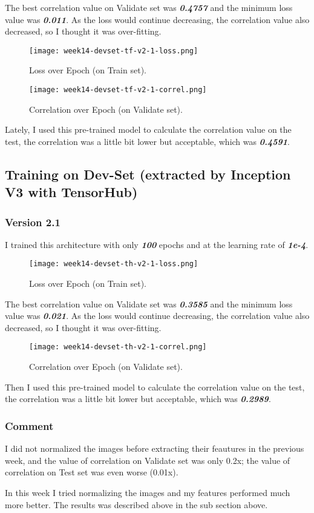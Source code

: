 The best correlation value on Validate set was \textbf{\emph{0.4757}} and the minimum loss value was \textbf{\emph{0.011}}. As the loss would continue decreasing, the correlation value also decreased, so I thought it was over-fitting.

\begin{figure}[!ht]
\centering
\texttt{[image: week14-devset-tf-v2-1-loss.png]}
\caption{Loss over Epoch (on Train set).}
\end{figure}

\newpage
\begin{figure}[!ht]
\centering
\texttt{[image: week14-devset-tf-v2-1-correl.png]}
\caption{Correlation over Epoch (on Validate set).}
\end{figure}

Lately, I used this pre-trained model to calculate the correlation value on the test, the correlation was a little bit lower but acceptable, which was \textbf{\emph{0.4591}}.

\subsection{Training on Dev-Set (extracted by Inception V3 with TensorHub)}
\subsubsection{Version 2.1}
I trained this architecture with only \textbf{\emph{100}} epochs and at the learning rate of \textbf{\emph{1e-4}}.

\begin{figure}[!ht]
\centering
\texttt{[image: week14-devset-th-v2-1-loss.png]}
\caption{Loss over Epoch (on Train set).}
\end{figure}

The best correlation value on Validate set was \textbf{\emph{0.3585}} and the minimum loss value was \textbf{\emph{0.021}}. As the loss would continue decreasing, the correlation value also decreased, so I thought it was over-fitting.

\begin{figure}[!ht]
\centering
\texttt{[image: week14-devset-th-v2-1-correl.png]}
\caption{Correlation over Epoch (on Validate set).}
\end{figure}

Then I used this pre-trained model to calculate the correlation value on the test, the correlation was a little bit lower but acceptable, which was \textbf{\emph{0.2989}}.

\subsubsection{Comment}
I did not normalized the images before extracting their feautures in the previous week, and the value of correlation on Validate set was only 0.2x; the value of correlation on Test set was even worse (0.01x).

In this week I tried normalizing the images and my features performed much more better. The results was described above in the sub section above.